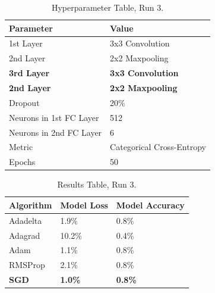 \documentclass[report, 11pt, oneside]{dissertation}
\begin{document}
\begin{table}[H]
\centering
	\begin{tabular}{|l|l|}
		\hline
		Parameter               & Value                     \\ \hline
		1st Layer               & 3x3 Convolution           \\ \hline
		2nd Layer               & 2x2 Maxpooling            \\ \hline
		\textbf{3rd Layer}      & \textbf{3x3 Convolution}  \\ \hline
		\textbf{2nd Layer}      & \textbf{2x2 Maxpooling}   \\ \hline
		Dropout                 & 20\%                      \\ \hline
		Neurons in 1st FC Layer & 512                       \\ \hline
		Neurons in 2nd FC Layer & 6                         \\ \hline
		Metric                  & Categorical Cross-Entropy \\ \hline
		Epochs                  & 50                        \\ \hline
	\end{tabular}
	\caption{Hyperparameter Table, Run 3.}
	\label{tab:parameters_3}
\end{table}

\begin{table}[H]
	\centering
	\begin{tabular}{|l|l|l|}
	\hline
		Algorithm    & Model Loss     & Model Accuracy \\ \hline
		Adadelta     & 1.9\%          & 0.8\%          \\ \hline
		Adagrad      & 10.2\%         & 0.4\%          \\ \hline
		Adam         & 1.1\%          & 0.8\%          \\ \hline
		RMSProp      & 2.1\%          & 0.8\%          \\ \hline
		\textbf{SGD} & \textbf{1.0\%} & \textbf{0.8\%} \\ \hline
		\end{tabular}
	\caption{Results Table, Run 3.}
	\label{tab:results_3}
\end{table}

\ \
\end{document}
